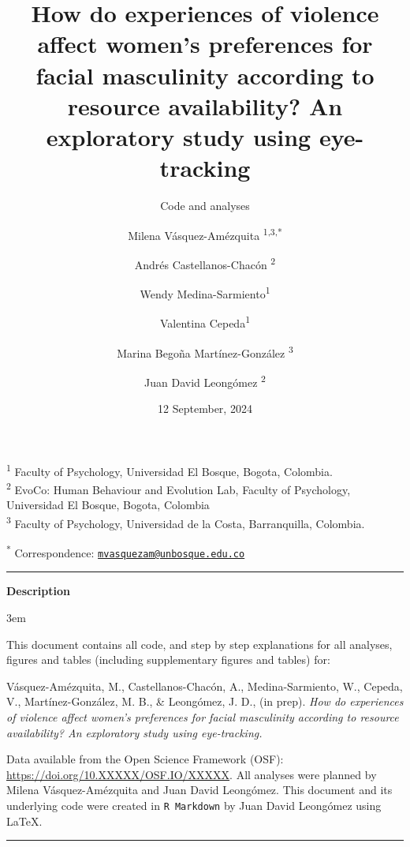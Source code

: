 \documentclass[
  bookmarksnumbered]{article}
\title{How do experiences of violence affect women's preferences for facial masculinity according to resource availability? An exploratory study using eye-tracking}
\subtitle{Code and analyses}
\author{Milena Vásquez-Amézquita \orcidlink{0000-0001-7317-8430}\textsuperscript{1,3,*} \and Andrés Castellanos-Chacón \orcidlink{0000-0003-1684-9319}\textsuperscript{2} \and Wendy Medina-Sarmiento\textsuperscript{1} \and Valentina Cepeda\textsuperscript{1} \and Marina Begoña Martínez-González \orcidlink{0000-0002-5840-6383}\textsuperscript{3} \and Juan David Leongómez \orcidlink{0000-0002-0092-6298}\textsuperscript{2}}
\date{12 September, 2024}
\begin{document}
\maketitle

\textsuperscript{1} Faculty of Psychology, Universidad El Bosque, Bogota, Colombia.\\
\textsuperscript{2} EvoCo: Human Behaviour and Evolution Lab, Faculty of Psychology, Universidad El Bosque, Bogota, Colombia\\
\textsuperscript{3} Faculty of Psychology, Universidad de la Costa, Barranquilla, Colombia.

\textsuperscript{*} Correspondence: \href{mailto:mvasquezam@unbosque.edu.co}{\href{mailto:mvasquezam@unbosque.edu.co}{\nolinkurl{mvasquezam@unbosque.edu.co}}}

\begin{center}\rule{0.5\linewidth}{0.5pt}\end{center}

\begin{center}
\textbf{Description}
\end{center}

\par
\begingroup
\leftskip3em
\rightskip\leftskip

This document contains all code, and step by step explanations for all analyses, figures and tables (including supplementary figures and tables) for:

\begin{hangparas}{.25in}{1}
Vásquez-Amézquita, M., Castellanos-Chacón, A., Medina-Sarmiento, W., Cepeda, V., Martínez-González, M. B., \& Leongómez, J. D.,  (in prep). \textit{How do experiences of violence affect women's preferences for facial masculinity according to resource availability? An exploratory study using eye-tracking.}
\end{hangparas}

Data available from the Open Science Framework (OSF): \url{https://doi.org/10.XXXXX/OSF.IO/XXXXX}. All analyses were planned by Milena Vásquez-Amézquita and Juan David Leongómez. This document and its underlying code were created in \texttt{R\ Markdown} by Juan David Leongómez using \LaTeX.

\begin{center}\rule{0.5\linewidth}{0.5pt}\end{center}

\par
\endgroup

{\hypersetup{hidelinks}
\setcounter{tocdepth}{6}
\tableofcontents
}
\opensupplement
\end{document}
